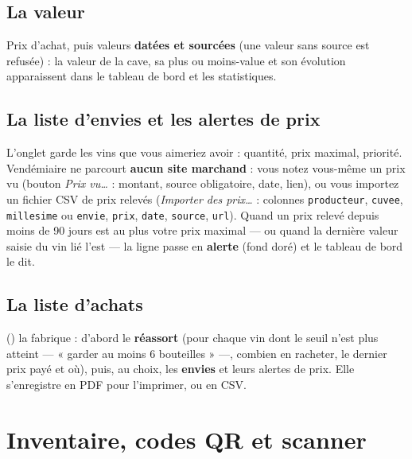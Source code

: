 \documentclass[11pt,a4paper]{article}
\begin{document}

\subsection{La valeur}
Prix d'achat, puis valeurs \textbf{datées et sourcées} (une valeur sans source est refusée) : la valeur de la
cave, sa plus ou moins-value et son évolution apparaissent dans le tableau de bord et les statistiques.

\subsection{La liste d'envies et les alertes de prix}
L'onglet  garde les vins que vous aimeriez avoir : quantité, prix maximal, priorité.
Vendémiaire ne parcourt \textbf{aucun site marchand} : vous notez vous-même un prix vu (bouton \emph{Prix
vu…} : montant, source obligatoire, date, lien), ou vous importez un fichier CSV de prix relevés
(\emph{Importer des prix…} : colonnes \texttt{producteur}, \texttt{cuvee}, \texttt{millesime} ou
\texttt{envie}, \texttt{prix}, \texttt{date}, \texttt{source}, \texttt{url}). Quand un prix relevé depuis moins
de 90 jours est au plus votre prix maximal — ou quand la dernière valeur saisie du vin lié l'est — la ligne
passe en \textbf{alerte} (fond doré) et le tableau de bord le dit.


\subsection{La liste d'achats}
 () la fabrique : d'abord le \textbf{réassort} (pour
chaque vin dont le seuil n'est plus atteint — « garder au moins 6 bouteilles » —, combien en racheter, le
dernier prix payé et où), puis, au choix, les \textbf{envies} et leurs alertes de prix. Elle s'enregistre en
PDF pour l'imprimer, ou en CSV.


\section{Inventaire, codes QR et scanner}
\end{document}
